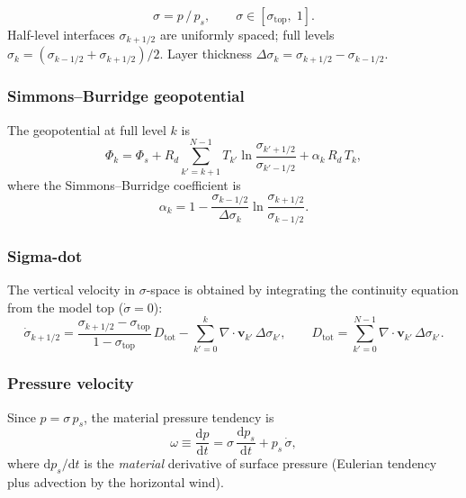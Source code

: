 \documentclass[11pt,a4paper]{article}
\newcommand{\dd}{\mathrm{d}}
\newcommand{\Rd}{R_d}
\begin{document}
\begin{equation}
  \sigma = p\,/\,p_s, \qquad \sigma\in[\sigma_{\mathrm{top}},\;1].
\end{equation}
Half-level interfaces $\sigma_{k+1/2}$ are uniformly spaced; full levels $\sigma_k=(\sigma_{k-1/2}+\sigma_{k+1/2})/2$.  Layer thickness $\Delta\sigma_k=\sigma_{k+1/2}-\sigma_{k-1/2}$.

\subsubsection{Simmons--Burridge geopotential}
The geopotential at full level $k$ is
\begin{equation}
  \Phi_k = \Phi_s + \Rd\!\sum_{k'=k+1}^{N-1}T_{k'}\ln\frac{\sigma_{k'+1/2}}{\sigma_{k'-1/2}}
  + \alpha_k\,\Rd\,T_k,
\end{equation}
where the Simmons--Burridge coefficient is
\begin{equation}
  \alpha_k = 1 - \frac{\sigma_{k-1/2}}{\Delta\sigma_k}\ln\frac{\sigma_{k+1/2}}{\sigma_{k-1/2}}.
\end{equation}

\subsubsection{Sigma-dot}
The vertical velocity in $\sigma$-space is obtained by integrating the continuity equation from the model top ($\dot\sigma=0$):
\begin{equation}
  \dot\sigma_{k+1/2} = \frac{\sigma_{k+1/2}-\sigma_{\mathrm{top}}}{1-\sigma_{\mathrm{top}}}\,D_{\mathrm{tot}} - \sum_{k'=0}^{k}\nabla\!\cdot\!\bm v_{k'}\,\Delta\sigma_{k'},
  \qquad D_{\mathrm{tot}}=\sum_{k'=0}^{N-1}\nabla\!\cdot\!\bm v_{k'}\,\Delta\sigma_{k'}.
\end{equation}

\subsubsection{Pressure velocity}
Since $p=\sigma\,p_s$, the material pressure tendency is
\begin{equation}
  \omega \equiv \frac{\dd p}{\dd t} = \sigma\,\frac{\dd p_s}{\dd t} + p_s\,\dot\sigma,
\end{equation}
where $\dd p_s/\dd t$ is the \emph{material} derivative of surface pressure (Eulerian tendency plus advection by the horizontal wind).

\end{document}

